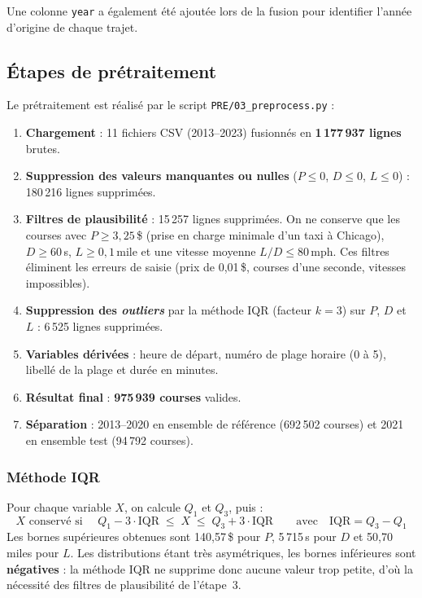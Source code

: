 \documentclass[11pt,a4paper]{article}
\begin{document}
Une colonne \texttt{year} a également été ajoutée lors de la fusion pour identifier l'année d'origine de
chaque trajet.

\subsection{Étapes de prétraitement}

Le prétraitement est réalisé par le script \texttt{PRE/03\_preprocess.py} :
\begin{enumerate}
  \item \textbf{Chargement} : 11 fichiers CSV (2013--2023) fusionnés en \textbf{1\,177\,937 lignes} brutes.
  \item \textbf{Suppression des valeurs manquantes ou nulles} ($P \le 0$, $D \le 0$, $L \le 0$) :
        180\,216 lignes supprimées.
  \item \textbf{Filtres de plausibilité} : 15\,257 lignes supprimées. On ne conserve que les courses avec
        $P \ge 3{,}25$\,\$ (prise en charge minimale d'un taxi à Chicago), $D \ge 60$\,s, $L \ge 0{,}1$\,mile et
        une vitesse moyenne $L/D \le 80$\,mph. Ces filtres éliminent les erreurs de saisie (prix de 0,01\,\$,
        courses d'une seconde, vitesses impossibles).
  \item \textbf{Suppression des \textit{outliers}} par la méthode IQR (facteur $k = 3$) sur $P$, $D$ et $L$ :
        6\,525 lignes supprimées.
  \item \textbf{Variables dérivées} : heure de départ, numéro de plage horaire (0 à 5), libellé de la plage et
        durée en minutes.
  \item \textbf{Résultat final} : \textbf{975\,939 courses} valides.
  \item \textbf{Séparation} : 2013--2020 en ensemble de référence (692\,502 courses) et 2021 en ensemble test
        (94\,792 courses).
\end{enumerate}

\subsubsection{Méthode IQR}

Pour chaque variable $X$, on calcule $Q_1$ et $Q_3$, puis :
\[
  X \text{ conservé si } \quad Q_1 - 3\cdot\mathrm{IQR} \;\le\; X \;\le\; Q_3 + 3\cdot\mathrm{IQR}
  \qquad \text{avec} \quad \mathrm{IQR} = Q_3 - Q_1
\]
Les bornes supérieures obtenues sont 140{,}57\,\$ pour $P$, 5\,715\,s pour $D$ et 50{,}70\,miles pour $L$.
Les distributions étant très asymétriques, les bornes inférieures sont \textbf{négatives} : la méthode IQR
ne supprime donc aucune valeur trop petite, d'où la nécessité des filtres de plausibilité de l'étape~3.
\end{document}
